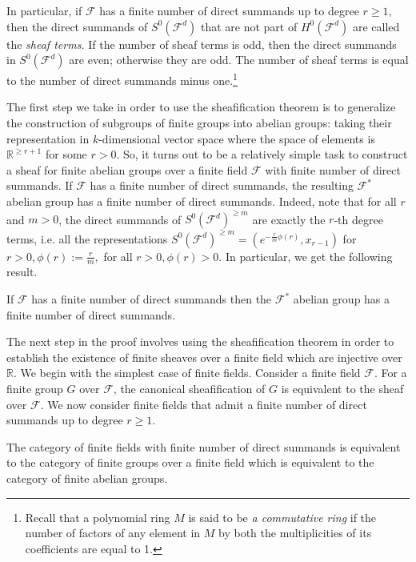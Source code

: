 \documentclass[a4paper,reqno,oneside]{article}
\begin{document}
In particular, if $\mathcal{F}$ has a finite number of direct summands up to degree $r\geq 1$, then the direct summands of $S^0(\mathcal{F}^d)$ that are not part of $H^0(\mathcal{F}^d)$ are called the {\em sheaf terms.} If the number of sheaf terms is odd, then the direct summands in $S^0(\mathcal{F}^d)$ are even; otherwise they are odd. The number of sheaf terms is equal to the number of direct summands minus one.\footnote{Recall that a polynomial ring $M$ is said to be {\em a commutative ring} if the number of factors of any element in $M$ by both the multiplicities of its coefficients are equal to 1.}

The first step we take in order to use the sheafification theorem is to generalize the construction of subgroups of finite groups into abelian groups: taking their representation in $k$-dimensional vector space where the space of elements is $\mathbb{R}^{\geq r+1}$ for some $r>0$. So, it turns out to be a relatively simple task to construct a sheaf for finite abelian groups over a finite field $\mathcal{F}$ with finite number of direct summands. If $\mathcal{F}$ has a finite number of direct summands, the resulting $\mathcal{F}^*$ abelian group has a finite number of direct summands. Indeed, note that for all $r$ and $m>0$, the direct summands of $S^0(\mathcal{F}^d)^{\geq m}$ are exactly the $r$-th degree terms, i.e. all the representations $S^0(\mathcal{F}^d)^{\geq m}=\left(e^{-\frac{r}{m}\phi(r)},x_{r-1}\right)$ for $r>0,\phi(r):=\frac{r}{m},$ for all $r>0,\phi(r)>0.$ In particular, we get the following result.



\begin{corollary}\label{cor:sheaf_over_field}
If $\mathcal{F}$ has a finite number of direct summands then the $\mathcal{F}^*$ abelian group has a finite number of direct summands.
\end{corollary}


The next step in the proof involves using the sheafification theorem in order to establish the existence of finite sheaves over a finite field which are injective over $\mathbb{R}$. We begin with the simplest case of finite fields. Consider a finite field $\mathcal{F}$. For a finite group $G$ over $\mathcal{F}$, the canonical sheafification of $G$ is equivalent to the sheaf over $\mathcal{F}$. We now consider finite fields that admit a finite number of direct summands up to degree $r\geq 1$. 

\begin{lemma}
The category of finite fields with finite number of direct summands is equivalent to the category of finite groups over a finite field which is equivalent to the category of finite abelian groups.
\end{lemma}
\end{document}
